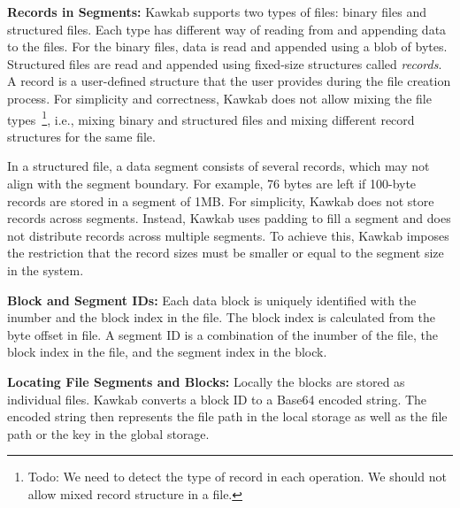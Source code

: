 \documentclass[]{article}
\newcommand{\subtopic}[1]{\vspace{1.5pt} \noindent \textbf{#1}}
\begin{document}

\subtopic{Records in Segments:} 
Kawkab supports two types of files: binary files and structured files.
Each type has different way of reading from and appending data to the files.
For the binary files, data is read and appended using a blob of bytes.
Structured files are read and appended using fixed-size structures
called \textit{records}. A record is a user-defined structure that
the user provides during the file creation process.
For simplicity and correctness, Kawkab does not allow mixing the file
types~\footnote{Todo: We need to detect the type of record in each operation. We
should not allow mixed record structure in a file.}, i.e., mixing binary and
structured files and mixing different record structures for the same file.


In a structured file, a data segment consists of several records, which may not
align with the segment boundary. For example, 76 bytes are left if 100-byte
records are stored in a segment of 1MB. For simplicity, Kawkab does not store
records across segments.  Instead, Kawkab uses padding to fill a segment and
does not distribute records across multiple segments. To achieve this, Kawkab
imposes the restriction that the record sizes must be smaller or equal to the
segment size in the system. 



\subtopic{Block and Segment IDs:} Each data block is uniquely identified with
the inumber and the block index in the file.  The block index is calculated
from the byte offset in file.  A segment ID is a combination of the inumber of
the file, the block index in the file, and the segment index in the block.


\subtopic{Locating File Segments and Blocks:} Locally the blocks are stored as
individual files.  Kawkab converts a block ID to a Base64 encoded string. The
encoded string then represents the file path in the local storage as well as
the file path or the key in the global storage.
\end{document}
